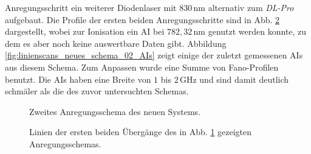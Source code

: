 Anregungsschritt ein weiterer Diodenlaser mit $830\,$nm alternativ zum
\textit{DL-Pro} aufgebaut. Die Profile der ersten beiden
Anregungsschritte sind in Abb. \ref{fig:linienscans_neues_schema_02}
dargestellt, wobei zur Ionisation ein AI bei $782,32\,$nm genutzt werden konnte,
zu dem es aber noch keine auswertbare Daten gibt. Abbildung
\ref{fig:linienscans_neues_schema_02_AIs} zeigt einige der zuletzt gemessenen
AIs aus diesem Schema. Zum Anpassen wurde eine Summe von Fano-Profilen benutzt.
Die AIs haben eine Breite von $1$ bis $2\,$GHz und sind damit deutlich schmäler
als die des zuvor untersuchten Schemas.
\begin{figure}[h]
 	\centering
	\caption[Anregungsschema, neu (2)]{Zweites Anregungsschema des neuen
	Systems.}
	\label{fig:anregungsschema_neu_02}
\end{figure}
\begin{figure}[hp]
 	\centering
 	\footnotesize
	\caption[erster und zweiter Anregungsschritt, neues System, Schema (2)]{Linien
	der ersten beiden Übergänge des in Abb. \ref{fig:anregungsschema_neu_02}
	gezeigten Anregungsschemas.}
	\label{fig:linienscans_neues_schema_02}
\end{figure}
